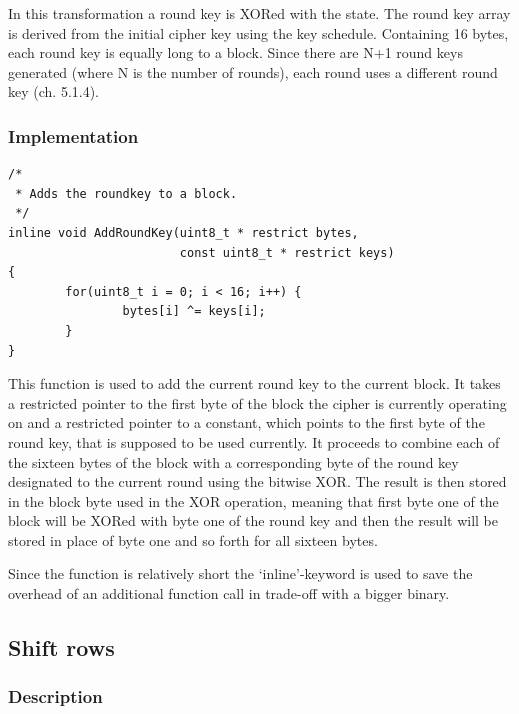In this transformation a round key is
XORed with the state. The round key array is
derived from the initial cipher key using the key schedule. Containing
16 bytes, each round key is equally long to a block. Since there are N+1
round keys generated (where N is the number of rounds), each round uses
a different round key (ch. 5.1.4).

\hypertarget{implementation-2}{%
\subsubsection{Implementation}\label{implementation-2}}

\begin{lstlisting}
/*
 * Adds the roundkey to a block.
 */
inline void AddRoundKey(uint8_t * restrict bytes, 
                        const uint8_t * restrict keys)
{
        for(uint8_t i = 0; i < 16; i++) {
                bytes[i] ^= keys[i];
        }
}
\end{lstlisting}

This function is used to add the current round key to the current block.
It takes a restricted pointer to the first byte of the block the cipher
is currently operating on and a restricted pointer to a constant, which
points to the first byte of the round key, that is supposed to be used
currently. It proceeds to combine each of the sixteen bytes of the block
with a corresponding byte of the round key designated to the current
round using the bitwise XOR. The result is then stored in the block byte
used in the XOR operation, meaning that first byte one of the block will
be XORed with byte one of the round key and then the result will be
stored in place of byte one and so forth for all sixteen bytes.

Since the function is relatively short the `inline'-keyword is used to
save the overhead of an additional function call in trade-off with a
bigger binary.

\hypertarget{shift-rows}{%
\subsection{Shift rows}\label{shift-rows}}

\hypertarget{description-3}{%
\subsubsection{Description}\label{description-3}}

